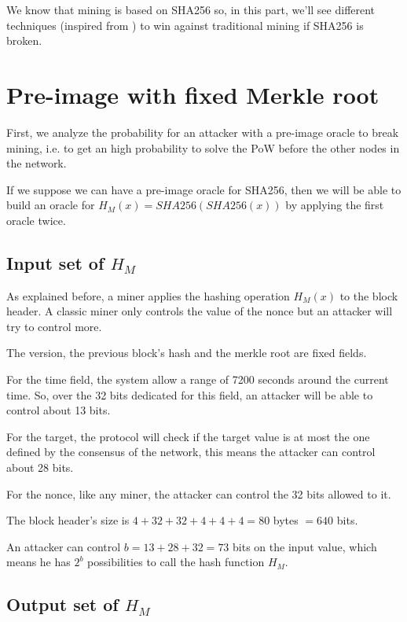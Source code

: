 We know that mining is based on SHA256 so, in this part, we'll see different techniques (inspired from \cite{broken_crypto_primitives}) to win against traditional mining if SHA256 is broken.

\section{Pre-image with fixed Merkle root}

First, we analyze the probability for an attacker with a pre-image oracle to break mining, i.e. to get an high probability to solve the PoW before the other nodes in the network.

If we suppose we can have a pre-image oracle for SHA256, then we will be able to build an oracle for $H_M(x) = SHA256(SHA256(x))$ by applying the first oracle twice.

	\subsection{Input set of $H_M$}

As explained before, a miner applies the hashing operation $H_M(x)$ to the block header. A classic miner only controls the value of the nonce but an attacker will try to control more. \newline

The version, the previous block's hash and the merkle root are fixed fields. \newline

For the time field, the system allow a range of 7200 seconds around the current time. So, over the 32 bits dedicated for this field, an attacker will be able to control about 13 bits.

For the target, the protocol will check if the target value is at most the one defined by the consensus of the network, this means the attacker can control about 28 bits.

For the nonce, like any miner, the attacker can control the 32 bits allowed to it. \newline

The block header's size is $4 + 32 + 32 + 4 + 4 + 4 = 80$ bytes $ = 640$ bits.

An attacker can control $b = 13 + 28 + 32 = 73$ bits on the input value, which means he has $2^b$ possibilities to call the hash function $H_M$.

	\subsection{Output set of $H_M$}

